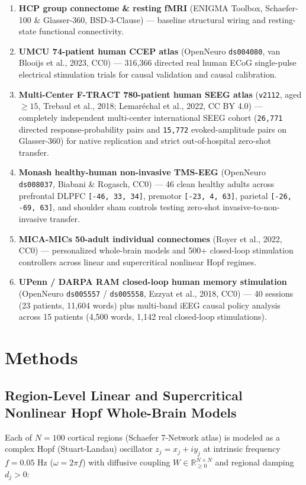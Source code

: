 \documentclass[11pt,a4paper]{article}
\begin{document}
\begin{enumerate}
\item \textbf{HCP group connectome \& resting fMRI} (ENIGMA Toolbox, Schaefer-100 \& Glasser-360, BSD-3-Clause) --- baseline structural wiring and resting-state functional connectivity.
\item \textbf{UMCU 74-patient human CCEP atlas} (OpenNeuro \texttt{ds004080}, van Blooijs et al., 2023, CC0) --- 316,366 directed real human ECoG single-pulse electrical stimulation trials for causal validation and causal calibration.
\item \textbf{Multi-Center F-TRACT 780-patient human SEEG atlas} (\texttt{v2112}, aged $\ge 15$, Trebaul et al., 2018; Lemaréchal et al., 2022, CC BY 4.0) --- completely independent multi-center international SEEG cohort (\texttt{26,771} directed response-probability pairs and \texttt{15,772} evoked-amplitude pairs on Glasser-360) for native replication and strict out-of-hospital zero-shot transfer.
\item \textbf{Monash healthy-human non-invasive TMS-EEG} (OpenNeuro \texttt{ds008037}, Biabani \& Rogasch, CC0) --- 46 clean healthy adults across prefrontal DLPFC \texttt{[-46, 33, 34]}, premotor \texttt{[-23, 4, 63]}, parietal \texttt{[-26, -69, 63]}, and shoulder sham controls testing zero-shot invasive-to-non-invasive transfer.
\item \textbf{MICA-MICs 50-adult individual connectomes} (Royer et al., 2022, CC0) --- personalized whole-brain models and 500+ closed-loop stimulation controllers across linear and supercritical nonlinear Hopf regimes.
\item \textbf{UPenn / DARPA RAM closed-loop human memory stimulation} (OpenNeuro \texttt{ds005557} / \texttt{ds005558}, Ezzyat et al., 2018, CC0) --- 40 sessions (23 patients, 11,604 words) plus multi-band iEEG causal policy analysis across 15 patients (4,500 words, 1,142 real closed-loop stimulations).
\end{enumerate}
\section{Methods}
\subsection{Region-Level Linear and Supercritical Nonlinear Hopf Whole-Brain Models}
Each of $N = 100$ cortical regions (Schaefer 7-Network atlas) is modeled as a complex Hopf (Stuart-Landau) oscillator $z_j = x_j + i y_j$ at intrinsic frequency $f = 0.05\text{ Hz}$ ($\omega = 2\pi f$) with diffusive coupling $W \in \mathbb{R}_{\ge 0}^{N\times N}$ and regional damping $d_j > 0$:
\end{document}
